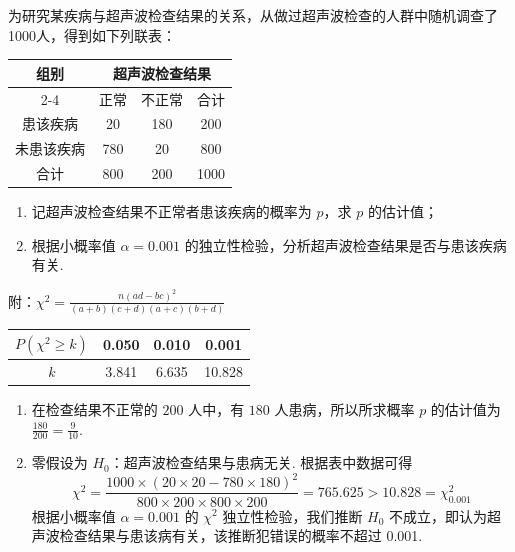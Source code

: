 \begin{problem}
为研究某疾病与超声波检查结果的关系，从做过超声波检查的人群中随机调查了1000人，得到如下列联表：

\begin{center}
\begin{tabular}{|c|c|c|c|}
\hline
\multicolumn{1}{|c|}{组别} & \multicolumn{3}{c|}{超声波检查结果} \\
\cline{2-4}
 & 正常 & 不正常 & 合计 \\
\hline
患该疾病 & 20 & 180 & 200 \\
\hline
未患该疾病 & 780 & 20 & 800 \\
\hline
合计 & 800 & 200 & 1000 \\
\hline
\end{tabular}
\end{center}

\begin{enumerate}
\item 记超声波检查结果不正常者患该疾病的概率为 \(p\)，求 \(p\) 的估计值；
\item 根据小概率值 \(\alpha = 0.001\) 的独立性检验，分析超声波检查结果是否与患该疾病有关.
\end{enumerate}

附：\(\chi^2 = \frac{n(ad-bc)^2}{(a+b)(c+d)(a+c)(b+d)}\)

\begin{center}
\begin{tabular}{|c|c|c|c|}
\hline
\(P(\chi^2 \ge k)\) & 0.050 & 0.010 & 0.001 \\
\hline
\(k\) & 3.841 & 6.635 & 10.828 \\
\hline
\end{tabular}
\end{center}
\end{problem}

\begin{solution}
\begin{enumerate}
\item 在检查结果不正常的 \(200\) 人中，有 \(180\) 人患病，所以所求概率 \(p\) 的估计值为 \(\frac{180}{200}=\frac{9}{10}\).

\item 零假设为 \(H_0\)：超声波检查结果与患病无关.
根据表中数据可得
\[
\chi^2=\frac{1000\times(20\times20-780\times180)^2}{800\times200\times800\times200}=765.625>10.828=\chi^2_{0.001}
\]
根据小概率值 \(\alpha=0.001\) 的 \(\chi^2\) 独立性检验，我们推断 \(H_0\) 不成立，即认为超声波检查结果与患该病有关，该推断犯错误的概率不超过 0.001.
\end{enumerate}
\end{solution}

